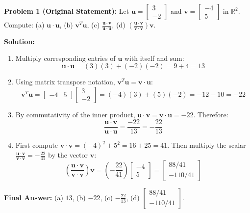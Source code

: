 \documentclass[11pt, letterpaper]{article}
\theoremstyle{definition}
\theoremstyle{remark}
\begin{document}
\textbf{Problem 1 (Original Statement):} Let $\mathbf{u} = \begin{bmatrix} 3 \\ -2 \end{bmatrix}$ and $\mathbf{v} = \begin{bmatrix} -4 \\ 5 \end{bmatrix}$ in $\mathbb{R}^2$. Compute: (a) $\mathbf{u} \cdot \mathbf{u}$, (b) $\mathbf{v}^T \mathbf{u}$, (c) $\frac{\mathbf{u} \cdot \mathbf{v}}{\mathbf{u} \cdot \mathbf{u}}$, (d) $\left(\frac{\mathbf{u} \cdot \mathbf{v}}{\mathbf{v} \cdot \mathbf{v}}\right)\mathbf{v}$.

\textbf{Solution:}
\begin{enumerate}[label=(\alph*)]
    \item Multiply corresponding entries of $\mathbf{u}$ with itself and sum:
    \[
    \mathbf{u} \cdot \mathbf{u} = (3)(3) + (-2)(-2) = 9 + 4 = 13
    \]
    \item Using matrix transpose notation, $\mathbf{v}^T \mathbf{u} = \mathbf{v} \cdot \mathbf{u}$:
    \[
    \mathbf{v}^T \mathbf{u} = \begin{bmatrix} -4 & 5 \end{bmatrix} \begin{bmatrix} 3 \\ -2 \end{bmatrix} = (-4)(3) + (5)(-2) = -12 - 10 = -22
    \]
    \item By commutativity of the inner product, $\mathbf{u} \cdot \mathbf{v} = \mathbf{v} \cdot \mathbf{u} = -22$. Therefore:
    \[
    \frac{\mathbf{u} \cdot \mathbf{v}}{\mathbf{u} \cdot \mathbf{u}} = \frac{-22}{13} = -\frac{22}{13}
    \]
    \item First compute $\mathbf{v} \cdot \mathbf{v} = (-4)^2 + 5^2 = 16 + 25 = 41$. Then multiply the scalar $\frac{\mathbf{u} \cdot \mathbf{v}}{\mathbf{v} \cdot \mathbf{v}} = -\frac{22}{41}$ by the vector $\mathbf{v}$:
    \[
    \left(\frac{\mathbf{u} \cdot \mathbf{v}}{\mathbf{v} \cdot \mathbf{v}}\right)\mathbf{v} = \left(-\frac{22}{41}\right)\begin{bmatrix} -4 \\ 5 \end{bmatrix} = \begin{bmatrix} 88/41 \\ -110/41 \end{bmatrix}
    \]
\end{enumerate}
\textbf{Final Answer:} (a) $13$, (b) $-22$, (c) $-\frac{22}{13}$, (d) $\begin{bmatrix} 88/41 \\ -110/41 \end{bmatrix}$.
\end{document}
